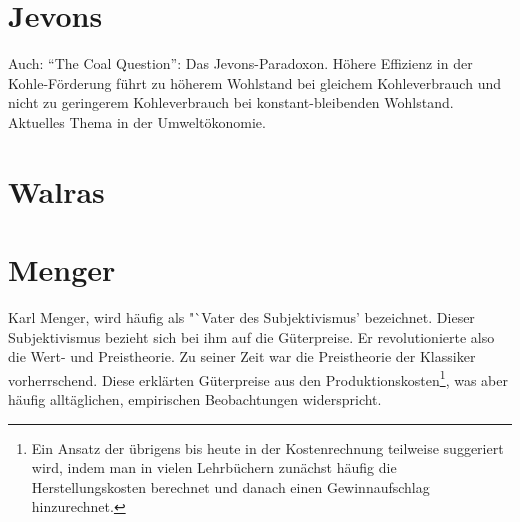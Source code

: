 \section{Jevons}
\label{Jevons}

Auch: "`The Coal Question"': Das Jevons-Paradoxon. Höhere Effizienz in der Kohle-Förderung führt zu höherem Wohlstand bei gleichem Kohleverbrauch und nicht zu geringerem Kohleverbrauch bei konstant-bleibenden Wohlstand. Aktuelles Thema in der Umweltökonomie.


\section{Walras}
\label{Walras}

\section{Menger}
\label{Wiener Schule}

Karl Menger, wird häufig als "`Vater des Subjektivismus' bezeichnet. Dieser Subjektivismus bezieht sich bei ihm auf die Güterpreise. Er revolutionierte also die Wert- und Preistheorie. Zu seiner Zeit war die Preistheorie der Klassiker vorherrschend. Diese erklärten Güterpreise aus den Produktionskosten\footnote{Ein Ansatz der übrigens bis heute in der Kostenrechnung teilweise suggeriert wird, indem man in vielen Lehrbüchern zunächst häufig die Herstellungskosten berechnet und danach einen Gewinnaufschlag hinzurechnet.}, was aber häufig alltäglichen, empirischen Beobachtungen widerspricht. 

